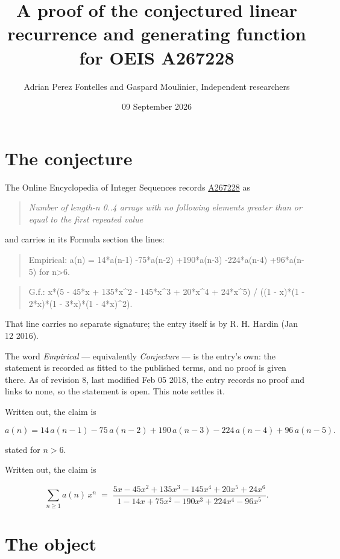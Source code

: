 \documentclass[11pt]{article}
\title{A proof of the conjectured linear recurrence and generating function for OEIS A267228}
\author{Adrian Perez Fontelles and Gaspard Moulinier, Independent researchers}
\date{09 September 2026}
\theoremstyle{definition}
\begin{document}
\maketitle
\section{The conjecture}

The Online Encyclopedia of Integer Sequences records \href{https://oeis.org/A267228}{A267228} as

\begin{quote}\itshape Number of length-n 0..4 arrays with no following elements greater than or equal to the first repeated value\end{quote}

and carries in its Formula section the lines:

\begin{quote}\ttfamily Empirical: a(n) = 14*a(n-1) -75*a(n-2) +190*a(n-3) -224*a(n-4) +96*a(n-5) for n>6.\end{quote}

\begin{quote}\ttfamily G.f.: x*(5 - 45*x + 135*x\textasciicircum{}2 - 145*x\textasciicircum{}3 + 20*x\textasciicircum{}4 + 24*x\textasciicircum{}5) / ((1 - x)*(1 - 2*x)*(1 - 3*x)*(1 - 4*x)\textasciicircum{}2).\end{quote}

That line carries no separate signature; the entry itself is by R. H. Hardin (Jan 12 2016).

The word {\itshape Empirical} --- equivalently {\itshape Conjecture} --- is the entry's own: the statement is recorded as fitted to the published terms, and no proof is given there. As of revision 8, last modified Feb 05 2018, the entry records no proof and links to none, so the statement is open. This note settles it.

Written out, the claim is

\[a(n) = 14\,a(n-1) - 75\,a(n-2) + 190\,a(n-3) - 224\,a(n-4) + 96\,a(n-5).\]

stated for $n > 6$.

Written out, the claim is

\[\sum_{n \ge 1} a(n)\,x^n \;=\; \frac{5x - 45x^{2} + 135x^{3} - 145x^{4} + 20x^{5} + 24x^{6}}{1 - 14x + 75x^{2} - 190x^{3} + 224x^{4} - 96x^{5}}.\]

\section{The object}
\end{document}
